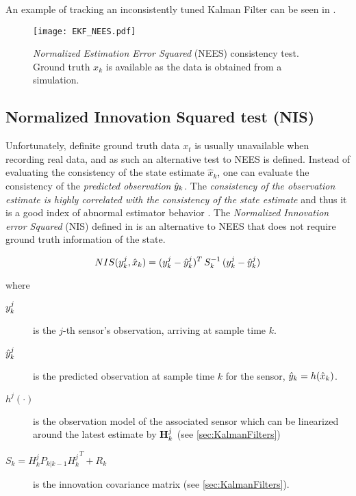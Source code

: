 An example of tracking an inconsistently tuned Kalman Filter can be seen in .
\begin{figure}[H]
	\centering
	\texttt{[image: EKF\_NEES.pdf]}
	\caption{\emph{Normalized Estimation Error Squared} (NEES) consistency test. Ground truth $x_k$ is available as the data is obtained from a simulation.}
	\label{fig:ekfnees}
\end{figure}



\subsection{Normalized Innovation Squared test (NIS)}\label{ssec:NIS}
Unfortunately, definite ground truth data $x_t$ is usually unavailable when recording real data, and as such an alternative test to NEES is defined. Instead of evaluating the consistency of the state estimate $\hat{x}_k$, one can evaluate the consistency of the \emph{predicted observation} ${\hat{{y}}}_k$. The \emph{consistency of the observation estimate is highly correlated with the consistency of the state estimate} and thus it is a good index of abnormal estimator behavior \cite{Ivanov2014}. The \emph{Normalized Innovation error Squared} (NIS) defined in  is an alternative to NEES that does not require ground truth information of the state.



\begin{framed}
	
\begin{equation}\label{eq:NIS}
NIS({y}^j_k,\hat{x}_k) = ({{y}}^j_k - {{\hat{{y}}}}^j_k)^T \, S_k^{-1} \, ({{y}}^j_k - {{\hat{{y}}}}^j_k)
\end{equation}

where

\begin{description}
	\item[$ {y}^j_k $] is the $j$-th sensor's observation, arriving at sample time $k$.
	\item[$ {\hat{{y}}}^j_k $] is the predicted observation at sample time $k$ for the  sensor, \ie $ {\hat{{y}}}_k =  h(\hat{x}_k)$.
	\item[$h^j(\cdot)$] is the observation model of the associated sensor which can be linearized around the latest estimate by $\mathbf{H}^j_k$ (see \cref{sec:KalmanFilters})
	\item[$S_k = H^j_k P_{k|k-1} {H^j_k}^T + R_k$] is the innovation covariance matrix (see \cref{sec:KalmanFilters}).
\end{description}
\end{framed}

